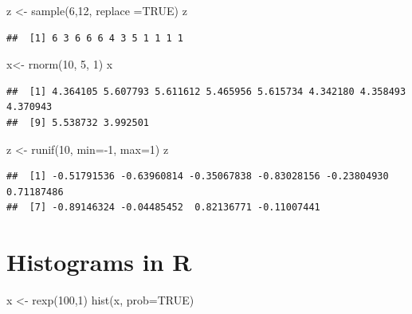 \documentclass[
]{article}
\newenvironment{Shaded}{\begin{snugshade}}{\end{snugshade}}
\newcommand{\AttributeTok}[1]{\textcolor[rgb]{0.77,0.63,0.00}{#1}}
\newcommand{\ConstantTok}[1]{\textcolor[rgb]{0.00,0.00,0.00}{#1}}
\newcommand{\DecValTok}[1]{\textcolor[rgb]{0.00,0.00,0.81}{#1}}
\newcommand{\FunctionTok}[1]{\textcolor[rgb]{0.00,0.00,0.00}{#1}}
\newcommand{\NormalTok}[1]{#1}
\newcommand{\OtherTok}[1]{\textcolor[rgb]{0.56,0.35,0.01}{#1}}
\newcommand{\SpecialCharTok}[1]{\textcolor[rgb]{0.00,0.00,0.00}{#1}}
\theoremstyle{definition}
\theoremstyle{definition}
\theoremstyle{definition}
\theoremstyle{remark}
\begin{document}
\begin{Shaded}
\begin{Highlighting}[]
\NormalTok{z }\OtherTok{\textless{}{-}} \FunctionTok{sample}\NormalTok{(}\DecValTok{6}\NormalTok{,}\DecValTok{12}\NormalTok{, }\AttributeTok{replace =}\ConstantTok{TRUE}\NormalTok{)}
\NormalTok{z}
\end{Highlighting}
\end{Shaded}

\begin{verbatim}
##  [1] 6 3 6 6 6 4 3 5 1 1 1 1
\end{verbatim}

\begin{Shaded}
\begin{Highlighting}[]
\NormalTok{x}\OtherTok{\textless{}{-}} \FunctionTok{rnorm}\NormalTok{(}\DecValTok{10}\NormalTok{, }\DecValTok{5}\NormalTok{, }\DecValTok{1}\NormalTok{)}
\NormalTok{x}
\end{Highlighting}
\end{Shaded}

\begin{verbatim}
##  [1] 4.364105 5.607793 5.611612 5.465956 5.615734 4.342180 4.358493 4.370943
##  [9] 5.538732 3.992501
\end{verbatim}

\begin{Shaded}
\begin{Highlighting}[]
\NormalTok{z }\OtherTok{\textless{}{-}} \FunctionTok{runif}\NormalTok{(}\DecValTok{10}\NormalTok{, }\AttributeTok{min=}\SpecialCharTok{{-}}\DecValTok{1}\NormalTok{, }\AttributeTok{max=}\DecValTok{1}\NormalTok{)}
\NormalTok{z}
\end{Highlighting}
\end{Shaded}

\begin{verbatim}
##  [1] -0.51791536 -0.63960814 -0.35067838 -0.83028156 -0.23804930  0.71187486
##  [7] -0.89146324 -0.04485452  0.82136771 -0.11007441
\end{verbatim}

\hypertarget{histograms-in-r}{%
\section{Histograms in R}\label{histograms-in-r}}

\begin{Shaded}
\begin{Highlighting}[]
\NormalTok{x }\OtherTok{\textless{}{-}} \FunctionTok{rexp}\NormalTok{(}\DecValTok{100}\NormalTok{,}\DecValTok{1}\NormalTok{)}
\FunctionTok{hist}\NormalTok{(x, }\AttributeTok{prob=}\ConstantTok{TRUE}\NormalTok{)}
\end{Highlighting}
\end{Shaded}
\end{document}
